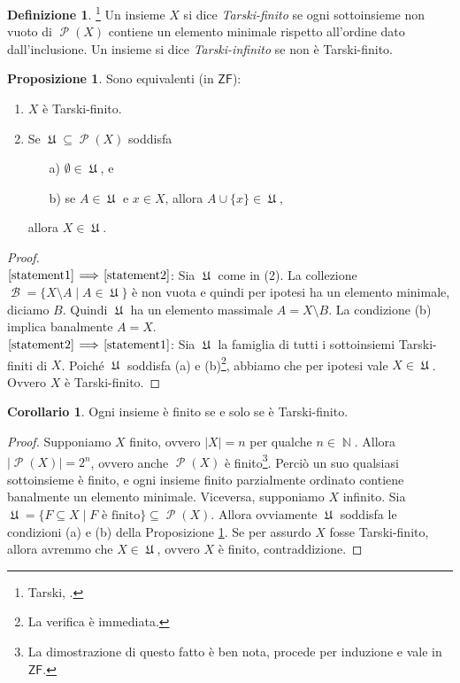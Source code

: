 \documentclass[12pt,a4paper]{report}
\theoremstyle{definition}
\newtheorem{defn}[teo]{Definizione}  %
\newtheorem{prop}[teo]{Proposizione}  %
\newtheorem{corollario}[teo]{Corollario}  %
\theoremstyle{num.custom-title}
\DeclareMathOperator{\B}{\mathcal{B}}
\DeclareMathOperator{\PP}{\mathcal{P}}
\DeclareMathOperator{\N}{\mathbb{N}}
\DeclareMathOperator{\U}{\mathfrak{U}}
\DeclareMathOperator{\sm}{\setminus}
\newcommand{\ZF}{\ensuremath{\mathsf{ZF}}\xspace}
\newcommand{\Implies}[2]{$\text{\ref{statement#1}}\!\implies\!\text{\ref{statement#2}}$}%
\newcommand{\punto}[1]{\item \label{statement#1}}
\newenvironment{equivalence}
    {\begin{enumerate}[label=(\arabic*),ref=(\arabic*)]
    }
    { 
	\end{enumerate}
    }
\begin{document}
\begin{defn}\footnote{Tarski, \cite{Tar24a:Herrlich}.}
Un insieme $X$ si dice \emph{Tarski-finito} se ogni sottoinsieme non vuoto di $\PP(X)$ contiene un elemento minimale rispetto all'ordine dato dall'inclusione. Un insieme si dice \emph{Tarski-infinito} se non è Tarski-finito.
\end{defn}

\begin{prop}\label{caratt_t-fin} Sono equivalenti (in \ZF):
\begin{equivalence}
\punto{1} $X$ è Tarski-finito.
\punto{2} Se $\U \subseteq \PP(X)$ soddisfa
\begin{itemize}
\item[a)] $\emptyset \in \U$, e
\item[b)] se $A \in \U$ e $x \in X$, allora $A \cup \{x\} \in \U$,
\end{itemize}
allora $X \in \U$.
\end{equivalence}
\begin{proof}\ \\
\Implies{1}{2}: Sia $\U$ come in (2). La collezione $\B = \{X \sm A \mid A \in \U\}$ è non vuota e quindi per ipotesi ha un elemento minimale, diciamo $B$. Quindi $\U$ ha un elemento massimale $A = X \sm B$. La condizione (b) implica banalmente $A=X$.\\
\Implies{2}{1}: Sia $\U$ la famiglia di tutti i sottoinsiemi Tarski-finiti di $X$. Poiché $\U$ soddisfa (a) e (b)\footnote{La verifica è immediata.}, abbiamo che per ipotesi vale $X \in \U$. Ovvero $X$ è Tarski-finito.
\end{proof}
\end{prop}

\begin{corollario}
Ogni insieme è finito se e solo se è Tarski-finito.
\begin{proof}
Supponiamo $X$ finito, ovvero $|X|=n$ per qualche $n \in \N$. Allora $|\PP(X)|=2^n$, ovvero anche $\PP(X)$ è finito\footnote{La dimostrazione di questo fatto è ben nota, procede per induzione e vale in \ZF.}. Perciò un suo qualsiasi sottoinsieme è finito, e ogni insieme finito parzialmente ordinato contiene banalmente un elemento minimale. Viceversa, supponiamo $X$ infinito. Sia $\U=\{F \subseteq X \mid F \text{ è finito}\} \subseteq \PP(X)$. Allora ovviamente $\U$ soddisfa le condizioni (a) e (b) della Proposizione \ref{caratt_t-fin}. Se per assurdo $X$ fosse Tarski-finito, allora avremmo che $X \in \U$, ovvero $X$ è finito, contraddizione.
\end{proof}
\end{corollario}
\end{document}
